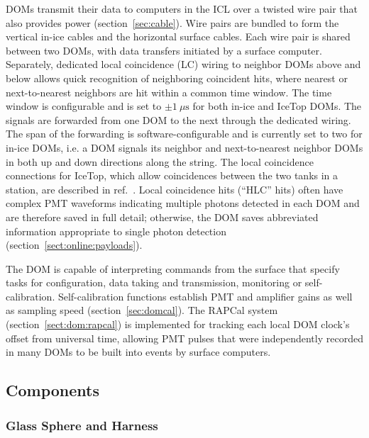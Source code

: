 DOMs transmit their data to computers in the ICL
over a twisted wire pair that also provides power (section~\ref{sec:cable}).
Wire pairs are bundled to form the vertical in-ice cables and the horizontal surface
cables.  Each wire pair is shared between two DOMs, with data transfers
initiated by a surface computer.  Separately, dedicated local coincidence
(LC) wiring to neighbor DOMs above and below allows quick recognition of neighboring
coincident hits, where
nearest or next-to-nearest neighbors are hit within a common time
window. The time window is configurable and is set to $\pm1~\mu\mathrm{s}$
for both in-ice and IceTop DOMs. The signals are forwarded from one DOM to the next
through the dedicated wiring.  The span of the forwarding is
software-configurable and is currently set to two for in-ice DOMs,
i.e. a DOM signals its neighbor and next-to-nearest neighbor DOMs in
both up and down directions along the string. The local coincidence
connections for IceTop, which allow coincidences between the two tanks in a
station, are described in ref.~\cite{ICECUBE:IceTop}. Local coincidence
hits (``HLC'' hits) often have complex PMT waveforms
indicating multiple photons detected in each DOM and are therefore saved
in full detail; otherwise, the DOM saves abbreviated information appropriate
to single photon detection (section~\ref{sect:online:payloads}).

The DOM is capable of interpreting commands from the surface that specify
tasks for configuration, data taking and transmission, monitoring or
self-calibration.  Self-calibration functions establish PMT and amplifier
gains as well as sampling speed (section~\ref{sec:domcal}).  The RAPCal
system (section~\ref{sect:dom:rapcal}) is implemented for tracking each
local DOM clock's offset from universal time, allowing PMT pulses that were
independently recorded in many DOMs to be built into events by surface
computers.

\subsection{\label{sec:dom_components}Components}

\subsubsection{\label{sec:sphere}Glass Sphere and Harness}

